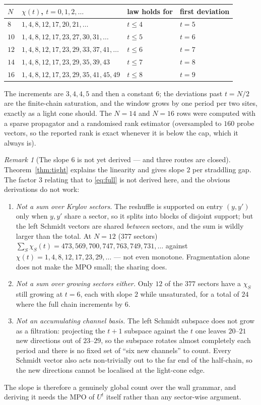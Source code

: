 \documentclass[11pt]{article}
\theoremstyle{plain}
\theoremstyle{remark}
\newtheorem{remark}{Remark}
\begin{document}
\begin{center}
\begin{tabular}{llll}
\toprule
$N$ & $\chi(t)$, $t=0,1,2,\dots$ & law holds for & first deviation \\
\midrule
$8$  & $1,4,8,12,17,20,21,\dots$ & $t\le4$ & $t=5$ \\
$10$ & $1,4,8,12,17,23,27,30,31,\dots$ & $t\le5$ & $t=6$ \\
$12$ & $1,4,8,12,17,23,29,33,37,41,\dots$ & $t\le6$ & $t=7$ \\
$14$ & $1,4,8,12,17,23,29,35,39,43$ & $t\le7$ & $t=8$ \\
$16$ & $1,4,8,12,17,23,29,35,41,45,49$ & $t\le8$ & $t=9$ \\
\bottomrule
\end{tabular}
\end{center}

\noindent The increments are $3,4,4,5$ and then a constant $6$; the deviations
past $t=N/2$ are the finite-chain saturation, and the window grows by one period
per two sites, exactly as a light cone should. The $N=14$ and $N=16$ rows were
computed with a sparse propagator and a randomised rank estimator (oversampled
to $160$ probe vectors, so the reported rank is exact whenever it is below the
cap, which it always is).

\begin{remark}[The slope $6$ is not yet derived --- and three routes are closed]
Theorem~\ref{thm:tight} explains the linearity and gives slope $2$ per
straddling gap. The factor $3$ relating that to \eqref{eq:full} is not derived
here, and the obvious derivations do not work:
\begin{enumerate}
\item \emph{Not a sum over Krylov sectors.} The reshuffle is supported on entry
$(y,y')$ only when $y,y'$ share a sector, so it splits into blocks of disjoint
support; but the left Schmidt vectors are shared \emph{between} sectors, and the
sum is wildly larger than the total. At $N=12$ (377 sectors)
$\sum_S\chi_S(t) = 473,569,700,747,763,749,731,\dots$ against
$\chi(t)=1,4,8,12,17,23,29,\dots$ --- not even monotone. Fragmentation alone does
not make the MPO small; the sharing does.
\item \emph{Not a sum over growing sectors either.} Only $12$ of the $377$
sectors have a $\chi_S$ still growing at $t=6$, each with slope $2$ while
unsaturated, for a total of $24$ where the full chain increments by $6$.
\item \emph{Not an accumulating channel basis.} The left Schmidt subspace does
not grow as a filtration: projecting the $t{+}1$ subspace against the $t$ one
leaves $20$--$21$ new directions out of $23$--$29$, so the subspace rotates
almost completely each period and there is no fixed set of ``six new channels''
to count. Every Schmidt vector also acts non-trivially out to the far end of the
half-chain, so the new directions cannot be localised at the light-cone edge.
\end{enumerate}
The slope is therefore a genuinely global count over the wall grammar, and
deriving it needs the MPO of $U^t$ itself rather than any sector-wise argument.
\end{remark}
\end{document}
